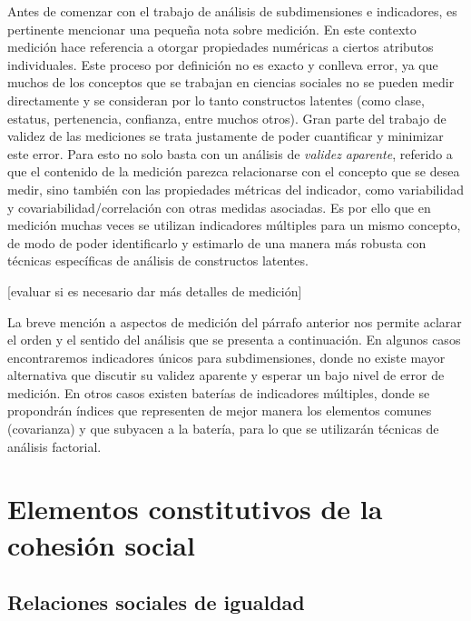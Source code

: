 \documentclass[
  12pt,
]{book}
\begin{document}
Antes de comenzar con el trabajo de análisis de subdimensiones e indicadores, es pertinente mencionar una pequeña nota sobre medición. En este contexto medición hace referencia a otorgar propiedades numéricas a ciertos atributos individuales. Este proceso por definición no es exacto y conlleva error, ya que muchos de los conceptos que se trabajan en ciencias sociales no se pueden medir directamente y se consideran por lo tanto constructos latentes (como clase, estatus, pertenencia, confianza, entre muchos otros). Gran parte del trabajo de validez de las mediciones se trata justamente de poder cuantificar y minimizar este error. Para esto no solo basta con un análisis de \emph{validez aparente}, referido a que el contenido de la medición parezca relacionarse con el concepto que se desea medir, sino también con las propiedades métricas del indicador, como variabilidad y covariabilidad/correlación con otras medidas asociadas. Es por ello que en medición muchas veces se utilizan indicadores múltiples para un mismo concepto, de modo de poder identificarlo y estimarlo de una manera más robusta con técnicas específicas de análisis de constructos latentes.

{[}evaluar si es necesario dar más detalles de medición{]}

La breve mención a aspectos de medición del párrafo anterior nos permite aclarar el orden y el sentido del análisis que se presenta a continuación. En algunos casos encontraremos indicadores únicos para subdimensiones, donde no existe mayor alternativa que discutir su validez aparente y esperar un bajo nivel de error de medición. En otros casos existen baterías de indicadores múltiples, donde se propondrán índices que representen de mejor manera los elementos comunes (covarianza) y que subyacen a la batería, para lo que se utilizarán técnicas de análisis factorial.

\hypertarget{elementos-constitutivos-de-la-cohesiuxf3n-social}{%
\section{Elementos constitutivos de la cohesión social}\label{elementos-constitutivos-de-la-cohesiuxf3n-social}}

\hypertarget{relaciones-sociales-de-igualdad}{%
\subsection{Relaciones sociales de igualdad}\label{relaciones-sociales-de-igualdad}}
\end{document}
